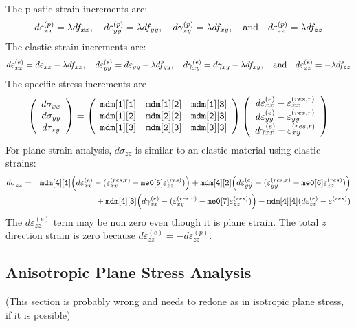 \documentclass[11pt]{article}
\def\code#1{{\small\tt #1}}
\def\e#1{\varepsilon_{#1}}
\def\er#1{\varepsilon_{#1}^{(res)}}
\def\err#1{\varepsilon_{#1}^{(res,r)}}
\def\g#1{\gamma_{#1}}
\def\s#1{\sigma_{#1}}
\def\t#1{\tau_{#1}}
\def\vvec#1#2#3{\left(\begin{array}{ccc} #1 \\ #2 \\ #3 \end{array}\right)}
\begin{document}
 The plastic strain increments are:
\begin{equation}
       d\varepsilon_{xx}^{(p)} = \lambda df_{xx}, \quad
       d\varepsilon_{yy}^{(p)} = \lambda df_{yy}, \quad
       d\gamma_{xy}^{(p)} =  \lambda df_{xy}, \quad  {\rm and} \quad
       d\varepsilon_{zz}^{(p)} = \lambda df_{zz}
\end{equation}
The elastic strain increments are:
\begin{equation}
       d\varepsilon_{xx}^{(e)} = d\varepsilon_{xx} -\lambda df_{xx}, \quad
       d\varepsilon_{yy}^{(e)} = d\varepsilon_{yy} -\lambda df_{yy}, \quad
       d\gamma_{xy}^{(e)} = d\gamma_{xy} -  \lambda df_{xy}, \quad  {\rm and} \quad
       d\varepsilon_{zz}^{(e)} =  -\lambda df_{zz}
\end{equation}
The specific stress increments are
\begin{equation}
      \vvec{d\s{xx}}{d\s{yy}}{d\t{xy}} = \left(\begin{array}{ccc}
      		\code{mdm[1][1]} & \code{mdm[1][2]} & \code{mdm[1][3]}  \\
      		\code{mdm[1][2]} & \code{mdm[2][2]} & \code{mdm[2][3]}  \\
      		\code{mdm[1][3]} & \code{mdm[2][3]} & \code{mdm[3][3]} 
           \end{array}\right)
          \vvec{d\varepsilon_{xx}^{(e)}  - \err{xx}}{d\varepsilon_{yy}^{(e)}  -\err{yy}}{d\g{xx}^{(e)}-\err{xy}}
 \end{equation}
For plane strain analysis, $d\sigma_{zz}$ is similar to an elastic material using elastic strains:
 \begin{eqnarray}
     d\s{zz} & = & \code{mdm[4][1]} \Bigl(d\e{xx}^{(e)} -(\err{xx}-\code{me0[5]}\er{zz})\Bigr)
                         +  \code{mdm[4][2]}\Bigl(d\e{yy}^{(e)} -(\err{yy}-\code{me0[6]}\er{zz})\Bigr) 
     \nonumber \\
     && \qquad\qquad\mbox{}
                 + \code{mdm[4][3]}\Bigl(d\g{xx}^{(e)}-(\err{xy}-\code{me0[7]}\er{zz})\Bigr)  - \code{mdm[4][4]}(d\e{zz}^{(e)}-\er{})
\end{eqnarray}
The $d\e{zz}^{(e)}$ term may be non zero even though it is plane strain. The total $z$ direction strain is zero because $d\e{zz}^{(e)} = -d\e{zz}^{(p)}$.

\subsection{Anisotropic Plane Stress Analysis}

(This section is probably wrong and needs to redone as in isotropic plane stress, if it is possible)
\end{document}

